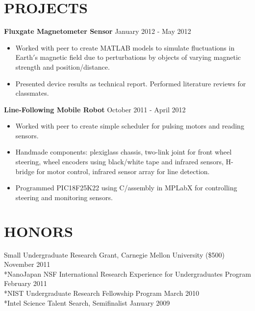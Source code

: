 \documentclass{res}
\begin{document}
      
\vspace{-0.1in}
\section{PROJECTS} 
\vspace{0.05in} 
    {\bf Fluxgate Magnetometer Sensor } \hfill January 2012 - May 2012
\begin{itemize}
    \item Worked with peer to create MATLAB models to simulate fluctuations in Earth$'$s magnetic field due to perturbations by objects of varying magnetic strength and position/distance. 
    \item Presented device results as technical report. Performed literature reviews for classmates.
\end{itemize}

    {\bf Line-Following Mobile Robot} \hfill October 2011 - April 2012
\begin{itemize}
    \item Worked with peer to create simple scheduler for pulsing motors and reading sensors.
    \item Handmade components: plexiglass chassis, two-link joint for front wheel steering, wheel encoders using black/white tape and infrared sensors, H-bridge for motor control, infrared sensor array for line detection. 
    \item Programmed PIC18F25K22 using C/assembly in MPLabX for controlling steering and monitoring sensors. 
\end{itemize}
 
   
\vspace{-0.1in}
    
\section{HONORS} 
\vspace{0.05in} 
Small Undergraduate Research Grant, Carnegie Mellon University (\$500) \hfill November 2011
\\*NanoJapan NSF International Research Experience for Undergraduates Program \hfill February 2011
\\*NIST Undergraduate Research Fellowship Program \hfill March 2010
\\*Intel Science Talent Search, Semifinalist \hfill January 2009
\end{document}
